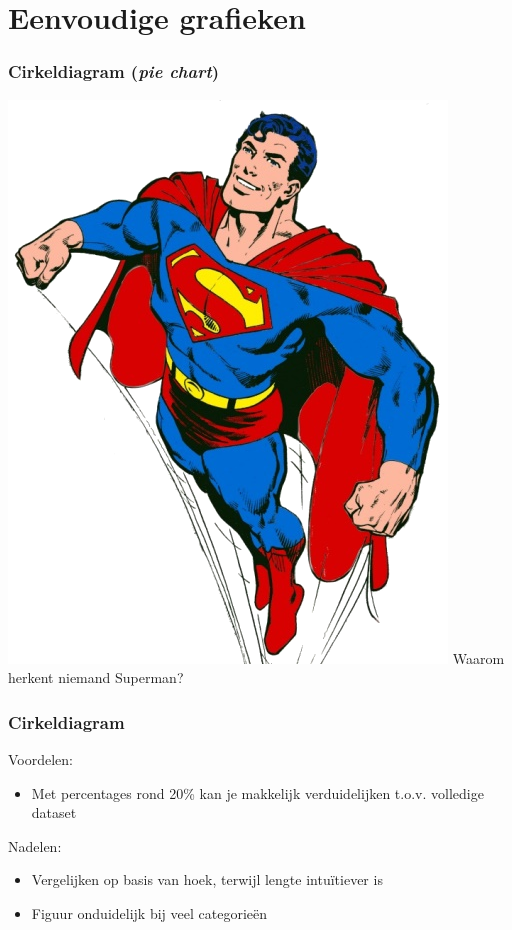 \documentclass{beamer}
\begin{document}
\begin{frame}[plain]

\end{frame}

\section{Eenvoudige grafieken}
\sectionframelogo{}

\begin{frame}
  \frametitle{Cirkeldiagram (\emph{pie chart})}

  \centering
  \includegraphics[width=.8cm]{img/les2-hero-3}
  Waarom herkent niemand Superman?

\end{frame}

\begin{frame}
  \frametitle{Cirkeldiagram}

  Voordelen:
  \begin{itemize}
    \item Met percentages rond 20\% kan je makkelijk verduidelijken t.o.v. volledige dataset
  \end{itemize}
  Nadelen:
  \begin{itemize}
    \item Vergelijken op basis van hoek, terwijl lengte intuïtiever is
    \item Figuur onduidelijk bij veel categorieën
  \end{itemize}

  \begin{center}
  \end{center}

\end{frame}
\end{document}
